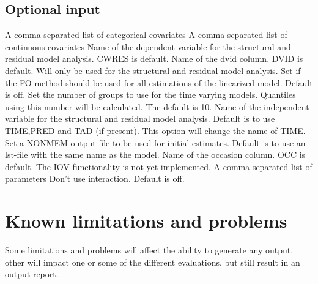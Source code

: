 \subsection{Optional input}



\begin{optionlist}
A comma separated list of categorical covariates
\nextopt
{}
A comma separated list of continuous covariates
\nextopt
{}
Name of the dependent variable for the structural and residual model analysis. CWRES is default.
\nextopt
{}
Name of the dvid column. DVID is default.
Will only be used for the structural and residual model analysis.
\nextopt
{}
Set if the FO method should be used for all estimations
of the linearized model. Default is off.
\nextopt
{}
Set the number of groups to use for the time varying models.
Quantiles using this number will be calculated.
The default is 10.
\nextopt
{}
Name of the independent variable for the structural and residual model analysis.
Default is to use TIME,PRED and TAD (if present). This option will change the name
of TIME.
\nextopt
{}
Set a NONMEM output file to be used for initial estimates.
Default is to use an lst-file with the same name as the model.
\nextopt
{}
Name of the occasion column. OCC is default.
The IOV functionality is not yet implemented.
\nextopt
{}
A comma separated list of parameters
\nextopt
        Don't use interaction. Default is off.
    \nextopt
\end{optionlist}

\section{Known limitations and problems}

Some limitations and problems will affect the ability to generate any output, other will impact one or some of the different evaluations, but still result in an output report. 

